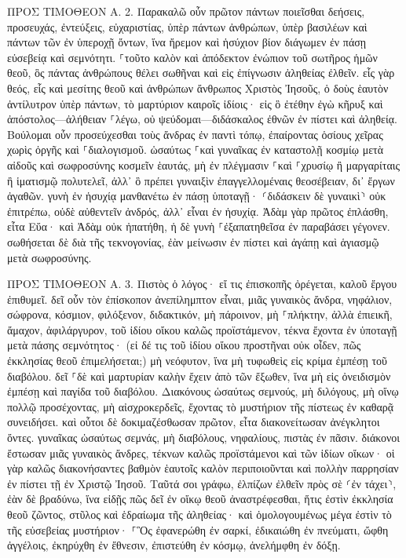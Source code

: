 \documentclass[twoside, 9pt]{extreport}
\begin{document}
ΠΡΟΣ ΤΙΜΟΘΕΟΝ Α.
2.
Παρακαλῶ οὖν πρῶτον πάντων ποιεῖσθαι δεήσεις, προσευχάς, ἐντεύξεις, εὐχαριστίας, ὑπὲρ πάντων ἀνθρώπων, 
ὑπὲρ βασιλέων καὶ πάντων τῶν ἐν ὑπεροχῇ ὄντων, ἵνα ἤρεμον καὶ ἡσύχιον βίον διάγωμεν ἐν πάσῃ εὐσεβείᾳ καὶ σεμνότητι. 
⸀τοῦτο καλὸν καὶ ἀπόδεκτον ἐνώπιον τοῦ σωτῆρος ἡμῶν θεοῦ, 
ὃς πάντας ἀνθρώπους θέλει σωθῆναι καὶ εἰς ἐπίγνωσιν ἀληθείας ἐλθεῖν. 
εἷς γὰρ θεός, εἷς καὶ μεσίτης θεοῦ καὶ ἀνθρώπων ἄνθρωπος Χριστὸς Ἰησοῦς, 
ὁ δοὺς ἑαυτὸν ἀντίλυτρον ὑπὲρ πάντων, τὸ μαρτύριον καιροῖς ἰδίοις· 
εἰς ὃ ἐτέθην ἐγὼ κῆρυξ καὶ ἀπόστολος—ἀλήθειαν ⸀λέγω, οὐ ψεύδομαι—διδάσκαλος ἐθνῶν ἐν πίστει καὶ ἀληθείᾳ. 
Βούλομαι οὖν προσεύχεσθαι τοὺς ἄνδρας ἐν παντὶ τόπῳ, ἐπαίροντας ὁσίους χεῖρας χωρὶς ὀργῆς καὶ ⸀διαλογισμοῦ. 
ὡσαύτως ⸀καὶ γυναῖκας ἐν καταστολῇ κοσμίῳ μετὰ αἰδοῦς καὶ σωφροσύνης κοσμεῖν ἑαυτάς, μὴ ἐν πλέγμασιν ⸀καὶ ⸀χρυσίῳ ἢ μαργαρίταις ἢ ἱματισμῷ πολυτελεῖ, 
ἀλλ᾽ ὃ πρέπει γυναιξὶν ἐπαγγελλομέναις θεοσέβειαν, δι᾽ ἔργων ἀγαθῶν. 
γυνὴ ἐν ἡσυχίᾳ μανθανέτω ἐν πάσῃ ὑποταγῇ· 
⸂διδάσκειν δὲ γυναικὶ⸃ οὐκ ἐπιτρέπω, οὐδὲ αὐθεντεῖν ἀνδρός, ἀλλ᾽ εἶναι ἐν ἡσυχίᾳ. 
Ἀδὰμ γὰρ πρῶτος ἐπλάσθη, εἶτα Εὕα· 
καὶ Ἀδὰμ οὐκ ἠπατήθη, ἡ δὲ γυνὴ ⸀ἐξαπατηθεῖσα ἐν παραβάσει γέγονεν. 
σωθήσεται δὲ διὰ τῆς τεκνογονίας, ἐὰν μείνωσιν ἐν πίστει καὶ ἀγάπῃ καὶ ἁγιασμῷ μετὰ σωφροσύνης. 

ΠΡΟΣ ΤΙΜΟΘΕΟΝ Α.
3.
Πιστὸς ὁ λόγος· εἴ τις ἐπισκοπῆς ὀρέγεται, καλοῦ ἔργου ἐπιθυμεῖ. 
δεῖ οὖν τὸν ἐπίσκοπον ἀνεπίλημπτον εἶναι, μιᾶς γυναικὸς ἄνδρα, νηφάλιον, σώφρονα, κόσμιον, φιλόξενον, διδακτικόν, 
μὴ πάροινον, μὴ ⸀πλήκτην, ἀλλὰ ἐπιεικῆ, ἄμαχον, ἀφιλάργυρον, 
τοῦ ἰδίου οἴκου καλῶς προϊστάμενον, τέκνα ἔχοντα ἐν ὑποταγῇ μετὰ πάσης σεμνότητος· 
(εἰ δέ τις τοῦ ἰδίου οἴκου προστῆναι οὐκ οἶδεν, πῶς ἐκκλησίας θεοῦ ἐπιμελήσεται;) 
μὴ νεόφυτον, ἵνα μὴ τυφωθεὶς εἰς κρίμα ἐμπέσῃ τοῦ διαβόλου. 
δεῖ ⸀δὲ καὶ μαρτυρίαν καλὴν ἔχειν ἀπὸ τῶν ἔξωθεν, ἵνα μὴ εἰς ὀνειδισμὸν ἐμπέσῃ καὶ παγίδα τοῦ διαβόλου. 
Διακόνους ὡσαύτως σεμνούς, μὴ διλόγους, μὴ οἴνῳ πολλῷ προσέχοντας, μὴ αἰσχροκερδεῖς, 
ἔχοντας τὸ μυστήριον τῆς πίστεως ἐν καθαρᾷ συνειδήσει. 
καὶ οὗτοι δὲ δοκιμαζέσθωσαν πρῶτον, εἶτα διακονείτωσαν ἀνέγκλητοι ὄντες. 
γυναῖκας ὡσαύτως σεμνάς, μὴ διαβόλους, νηφαλίους, πιστὰς ἐν πᾶσιν. 
διάκονοι ἔστωσαν μιᾶς γυναικὸς ἄνδρες, τέκνων καλῶς προϊστάμενοι καὶ τῶν ἰδίων οἴκων· 
οἱ γὰρ καλῶς διακονήσαντες βαθμὸν ἑαυτοῖς καλὸν περιποιοῦνται καὶ πολλὴν παρρησίαν ἐν πίστει τῇ ἐν Χριστῷ Ἰησοῦ. 
Ταῦτά σοι γράφω, ἐλπίζων ἐλθεῖν πρὸς σὲ ⸂ἐν τάχει⸃, 
ἐὰν δὲ βραδύνω, ἵνα εἰδῇς πῶς δεῖ ἐν οἴκῳ θεοῦ ἀναστρέφεσθαι, ἥτις ἐστὶν ἐκκλησία θεοῦ ζῶντος, στῦλος καὶ ἑδραίωμα τῆς ἀληθείας· 
καὶ ὁμολογουμένως μέγα ἐστὶν τὸ τῆς εὐσεβείας μυστήριον· ⸀Ὃς ἐφανερώθη ἐν σαρκί, ἐδικαιώθη ἐν πνεύματι, ὤφθη ἀγγέλοις, ἐκηρύχθη ἐν ἔθνεσιν, ἐπιστεύθη ἐν κόσμῳ, ἀνελήμφθη ἐν δόξῃ. 
\end{document}

